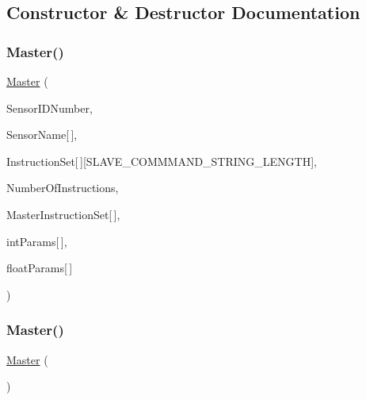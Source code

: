 \subsection{Constructor \& Destructor Documentation}
\mbox{\label{class_master_afd2e9903066a53c737be92639cfa15b0}} 
\subsubsection{\texorpdfstring{Master()}{Master()}\hspace{0.1cm}{\footnotesize\ttfamily [1/3]}}
{\footnotesize\ttfamily \mbox{\hyperlink{class_master}{Master}} (\begin{DoxyParamCaption}\item[{const int}]{Sensor\+I\+D\+Number,  }\item[{const char}]{Sensor\+Name\mbox{[}$\,$\mbox{]},  }\item[{const char}]{Instruction\+Set\mbox{[}$\,$\mbox{]}\mbox{[}\+S\+L\+A\+V\+E\+\_\+\+C\+O\+M\+M\+M\+A\+N\+D\+\_\+\+S\+T\+R\+I\+N\+G\+\_\+\+L\+E\+N\+G\+T\+H\mbox{]},  }\item[{const int}]{Number\+Of\+Instructions,  }\item[{const \mbox{\hyperlink{_s_p_i___instruction_set_8h_a949ec019a0f52780dcdd7d5a5ba73e47}{s\+Instruct}}}]{Master\+Instruction\+Set\mbox{[}$\,$\mbox{]},  }\item[{const int}]{int\+Params\mbox{[}$\,$\mbox{]},  }\item[{const float}]{float\+Params\mbox{[}$\,$\mbox{]} }\end{DoxyParamCaption})}

\mbox{\label{class_master_a89241ed8839b9fe5ec29d904630a9d3e}} 
\subsubsection{\texorpdfstring{Master()}{Master()}\hspace{0.1cm}{\footnotesize\ttfamily [2/3]}}
{\footnotesize\ttfamily \mbox{\hyperlink{class_master}{Master}} (\begin{DoxyParamCaption}\item[{void}]{ }\end{DoxyParamCaption})}

\mbox{\label{class_master_a58d721f62d1c8bbf84840b864f2e482a}} 
